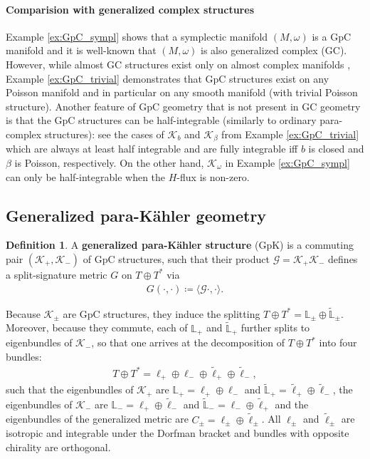 \documentclass{article}
\newcommand{\TT}{{T\oplus T^*}}
\newcommand{\KK}{\mathcal{K}}
\newcommand{\GG}{\mathcal{G}}
\newcommand{\Lb}{\mathbb{L}}
\newcommand{\ellt}{{\tl{\ell}}}
\newcommand{\la}{\langle}
\newcommand{\ra}{\rangle}
\def\tl{\tilde}
\theoremstyle{definition}
\newtheorem{Def}[theorem]{Definition}
\theoremstyle{remark}
\begin{document}
\paragraph{Comparision with generalized complex structures}
Example \ref{ex:GpC_sympl} shows that a symplectic manifold $(M,\omega)$ is a GpC manifold and it is well-known \cite{Gualtieri:2003dx} that $(M,\omega)$ is also generalized complex (GC). However, while almost GC structures exist only on almost complex manifolds \cite{Gualtieri:2003dx}, Example \ref{ex:GpC_trivial} demonstrates that GpC structures exist on any Poisson manifold and in particular on any smooth manifold (with trivial Poisson structure). Another feature of GpC geometry that is not present in GC geometry is that the GpC structures can be half-integrable (similarly to ordinary para-complex structures): see the cases of $\KK_b$ and $\KK_\beta$ from Example \ref{ex:GpC_trivial} which are always at least half integrable and are fully integrable iff $b$ is closed and $\beta$ is Poisson, respectively. On the other hand, $\KK_\omega$ in Example \ref{ex:GpC_sympl} can only be half-integrable when the $H$-flux is non-zero.


\subsection{Generalized para-K\"ahler geometry}\label{sec:GpK}
\begin{Def}
A \textbf{generalized para-K\"ahler structure} (GpK) is a commuting pair $(\KK_+,\KK_-)$ of GpC structures, such that their product $\GG=\KK_+\KK_-$ defines a split-signature metric $G$ on $\TT$ via
\begin{align*}
G(\cdot,\cdot)\coloneqq \la \GG\cdot,\cdot\ra.
\end{align*}
\end{Def}

Because $\KK_\pm$ are GpC structures, they induce the splitting $\TT= \Lb_\pm\oplus\widetilde{\Lb}_\pm$. Moreover, because they commute, each of $\Lb_+$ and $\widetilde{\Lb}_+$ further splits to eigenbundles of $\KK_-$, so that one arrives at the decomposition of $\TT$ into four bundles:
\begin{align}\label{GpK_bundles}
\TT=\ell_+\oplus\ell_-\oplus \ellt_+\oplus \ellt_-,
\end{align}
such that the eigenbundles of $\KK_+$ are $\Lb_+=\ell_+\oplus\ell_-$ and $\tl{\Lb}_+=\ellt_+\oplus \ellt_-$, the eigenbundles of $\KK_-$ are $\Lb_-=\ell_+\oplus\ellt_-$ and $\tl{\Lb}_-=\ell_-\oplus \ellt_+$ and the eigenbundles of the generalized metric are $C_\pm=\ell_\pm\oplus\ellt_\pm$. All $\ell_\pm$ and $\ellt_\pm$ are isotropic and integrable under the Dorfman bracket \cite{Hu:2019zro} and bundles with opposite chirality are orthogonal.
\end{document}
